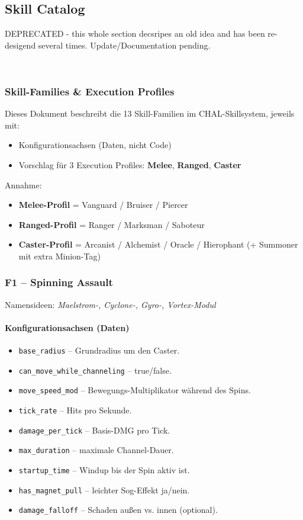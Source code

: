 \subsection{Skill Catalog}

\begin{huge}DEPRECATED - this whole section decsripes an old idea and has been re-desigend several times. Update/Documentation pending.
\end{huge}\\

\subsubsection*{Skill-Families \& Execution Profiles}
\label{subsec:skill-families-profiles}
Dieses Dokument beschreibt die 13 Skill-Familien im CHAL-Skillsystem, jeweils mit:
\begin{itemize}
	\item Konfigurationsachsen (Daten, nicht Code)
	\item Vorschlag für 3 Execution Profiles: \textbf{Melee}, \textbf{Ranged}, \textbf{Caster}
\end{itemize}

Annahme:
\begin{itemize}
	\item \textbf{Melee-Profil} = Vanguard / Bruiser / Piercer
	\item \textbf{Ranged-Profil} = Ranger / Marksman / Saboteur
	\item \textbf{Caster-Profil} = Arcanist / Alchemist / Oracle / Hierophant (+ Summoner mit extra Minion-Tag)
\end{itemize}

\subsubsection{F1 – Spinning Assault}
Namensideen: \emph{Maelstrom-, Cyclone-, Gyro-, Vortex-Modul}

\paragraph{Konfigurationsachsen (Daten)}{}

\begin{itemize}
	\item \texttt{base\_radius} – Grundradius um den Caster.
	\item \texttt{can\_move\_while\_channeling} – true/false.
	\item \texttt{move\_speed\_mod} – Bewegungs-Multiplikator während des Spins.
	\item \texttt{tick\_rate} – Hits pro Sekunde.
	\item \texttt{damage\_per\_tick} – Basis-DMG pro Tick.
	\item \texttt{max\_duration} – maximale Channel-Dauer.
	\item \texttt{startup\_time} – Windup bis der Spin aktiv ist.
	\item \texttt{has\_magnet\_pull} – leichter Sog-Effekt ja/nein.
	\item \texttt{damage\_falloff} – Schaden außen vs. innen (optional).
\end{itemize}

